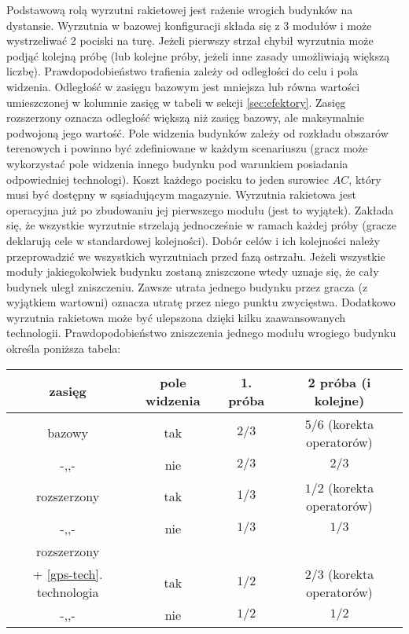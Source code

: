 \documentclass[11pt,a4paper]{article}
\begin{document}
Podstawową rolą wyrzutni rakietowej jest rażenie wrogich budynków na dystansie. Wyrzutnia w bazowej konfiguracji składa się z 3 modułów i może wystrzeliwać 2 pociski na turę. Jeżeli pierwszy strzał chybił wyrzutnia może podjąć kolejną próbę (lub kolejne próby, jeżeli inne zasady umożliwiają większą liczbę). Prawdopodobieństwo trafienia zależy od odległości do celu i pola widzenia. Odległość w zasięgu bazowym jest mniejsza lub równa wartości umieszczonej w kolumnie zasięg w tabeli w sekcji \ref{sec:efektory}. Zasięg rozszerzony oznacza odległość większą niż zasięg bazowy, ale maksymalnie podwojoną jego wartość. Pole widzenia budynków zależy od rozkładu obszarów terenowych i powinno być zdefiniowane w każdym scenariuszu (gracz może wykorzystać pole widzenia innego budynku pod warunkiem posiadania odpowiedniej technologi). Koszt każdego pocisku to jeden surowiec $AC$, który musi być dostępny w sąsiadującym magazynie. Wyrzutnia rakietowa jest operacyjna już po zbudowaniu jej pierwszego modułu (jest to wyjątek). Zakłada się, że wszystkie wyrzutnie strzelają jednocześnie w ramach każdej próby (gracze deklarują cele w standardowej kolejności). Dobór celów i ich kolejności należy przeprowadzić we wszystkich wyrzutniach przed fazą ostrzału. Jeżeli wszystkie moduły jakiegokolwiek budynku zostaną zniszczone wtedy uznaje się, że cały budynek uległ zniszczeniu. Zawsze utrata jednego budynku przez gracza  (z wyjątkiem wartowni) oznacza utratę przez niego punktu zwycięstwa. Dodatkowo wyrzutnia rakietowa może być ulepszona dzięki kilku zaawansowanych technologii. Prawdopodobieństwo zniszczenia jednego modułu wrogiego budynku określa poniższa tabela:
\begin{center}
\begin{tabular}{| c | c | c | c |}
  \hline
   \textbf{zasięg} & \textbf{pole widzenia} & \textbf{1. próba} & \textbf{2 próba} (i kolejne) \\
  \hline
  bazowy & tak   & $2/3$ & $5/6$ (korekta operatorów) \\  
  \hline
  -,,- & nie   & $2/3$ & $2/3$ \\  
  \hline
  rozszerzony & tak & $1/3$ & $1/2$ (korekta operatorów) \\  
  \hline
  -,,- & nie  & $1/3$ & $1/3$ \\  
  \hline
  rozszerzony  &  &  &  \\  
  + \ref{gps-tech}. technologia & tak  & $1/2$ & $2/3$ (korekta operatorów) \\  
  \hline
  -,,- & nie   & $1/2$ & $1/2$ \\  
  \hline
\end{tabular}
\end{center}
\end{document}
